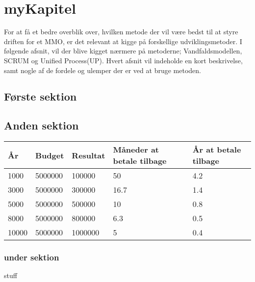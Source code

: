 \cfoot{\page\textbackslash \totalp} %
\chapter{myKapitel}
For at få et bedre overblik over, hvilken metode der vil være bedst til at styre driften for et MMO, er det relevant at kigge på forskellige udviklingsmetoder. I følgende afsnit, vil der blive kigget nærmere på metoderne; Vandfaldsmodellen, SCRUM og Unified Process(UP). Hvert afsnit vil indeholde en kort beskrivelse, samt nogle af de fordele og ulemper der er ved at bruge metoden.\\
\section{Første sektion}


\section{Anden sektion}


\begin{tabularx}{0.75\textwidth}{|X|X|X|X|X|}
\hline
År & Budget & Resultat & Måneder at betale tilbage & År at betale tilbage \\ \hline \hline
1000 & 5000000 & 100000 & 50 & 4.2 \\ \hline
3000 & 5000000 & 300000 & 16.7 & 1.4 \\ \hline
5000 & 5000000 & 500000 & 10 & 0.8 \\ \hline
8000 & 5000000 & 800000 & 6.3 & 0.5 \\ \hline
10000 & 5000000 & 1000000 & 5 & 0.4 \\ \hline
\end{tabularx}


\subsection{under sektion}

\cite{HTL}stuff
